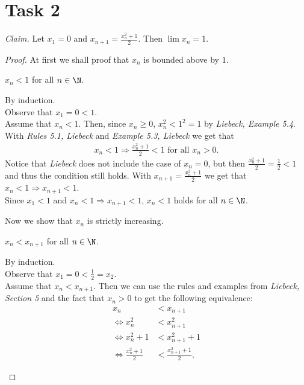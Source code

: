 \documentclass{article}
\begin{document}
\section*{Task 2}
\emph{Claim.} Let $x_1=0$ and $x_{n+1}=\frac{x_n^2+1}{2}$. Then $\lim x_n=1$.
\begin{proof}
	At first we shall proof that $x_n$ is bounded above by $1$.
	\begin{adjustwidth}{2em}{0pt}
		\begin{claim}
			$x_n<1$ for all $n\in\N$.
		\end{claim}
		\begin{claimproof}
			By induction.\\
			Observe that $x_1=0<1$.\\
			Assume that $x_n<1$. Then, since $x_n\geq 0$, $x_n^2<1^2=1$ by \emph{Liebeck, Example 5.4}. With \emph{Rules 5.1, Liebeck} and \emph{Example 5.3, Liebeck} we get that
			\begin{align*}
				x_n<1 \Rightarrow \frac{x_n^2+1}{2}<1 \text{ for all } x_n > 0.
			\end{align*}
			Notice that \emph{Liebeck} does not include the case of $x_n=0$, but then $\frac{x_n^2+1}{2}=\frac{1}{2}<1$ and thus the condition still holds.
			With $x_{n+1}=\frac{x^2_n+1}{2}$ we get that $x_n<1\Rightarrow x_{n+1}<1$.\\
			Since $x_1<1$ and $x_n<1 \Rightarrow x_{n+1}<1$, $x_n<1$ holds for all $n\in\N$.
		\end{claimproof}
	\end{adjustwidth}
	Now we show that $x_n$ is strictly increasing.
	\begin{adjustwidth}{2em}{0pt}
		\begin{claim}
			$x_n<x_{n+1}$ for all $n\in\N$.
		\end{claim}
		\begin{claimproof}
			By induction.\\
			Observe that $x_1=0<\frac{1}{2}=x_2$.\\
			Assume that $x_n<x_{n+1}$. Then we can use the rules and examples from \emph{Liebeck, Section 5} and the fact that $x_n>0$ to get the following equivalence:
			\begin{align*}
				x_n                               & <x_{n+1}                \\
				\Leftrightarrow x_n^2             & <x_{n+1}^2              \\
				\Leftrightarrow x_n^2+1           & <x_{n+1}^2+1            \\
				\Leftrightarrow \frac{x_n^2+1}{2} & <\frac{x_{n+1}^2+1}{2},

\end{align*}
\end{claimproof}
\end{adjustwidth}
\end{proof}
\end{document}

